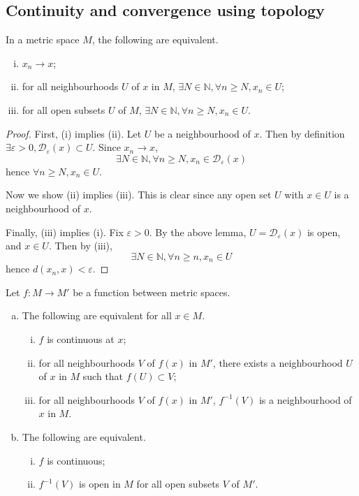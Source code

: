 \subsection{Continuity and convergence using topology}
\begin{proposition}
	In a metric space \( M \), the following are equivalent.
	\begin{enumerate}[(i)]
		\item \( x_n \to x \);
		\item for all neighbourhoods \( U \) of \( x \) in \( M \), \( \exists N \in \mathbb N, \forall n \geq N, x_n \in U \);
		\item for all open subsets \( U \) of \( M \), \( \exists N \in \mathbb N, \forall n \geq N, x_n \in U \).
	\end{enumerate}
\end{proposition}
\begin{proof}
	First, (i) implies (ii).
	Let \( U \) be a neighbourhood of \( x \).
	Then by definition \( \exists \varepsilon > 0, \mathcal D_\varepsilon(x) \subset U \).
	Since \( x_n \to x \),
	\[
		\exists N \in \mathbb N, \forall n \geq N, x_n \in \mathcal D_\varepsilon(x)
	\]
	hence \( \forall n \geq N, x_n \in U \).

	Now we show (ii) implies (iii).
	This is clear since any open set \( U \) with \( x \in U \) is a neighbourhood of \( x \).

	Finally, (iii) implies (i).
	Fix \( \varepsilon > 0 \).
	By the above lemma, \( U = \mathcal D_\varepsilon(x) \) is open, and \( x \in U \).
	Then by (iii),
	\[
		\exists N \in \mathbb N, \forall n \geq n, x_n \in U
	\]
	hence \( d(x_n, x) < \varepsilon \).
\end{proof}
\begin{proposition}
	Let \( f \colon M \to M' \) be a function between metric spaces.
	\begin{enumerate}[(a)]
		\item The following are equivalent for all \( x \in M \).
		      \begin{enumerate}[(i)]
			      \item \( f \) is continuous at \( x \);
			      \item for all neighbourhoods \( V \) of \( f(x) \) in \( M' \), there exists a neighbourhood \( U \) of \( x \) in \( M \) such that \( f(U) \subset V \);
			      \item for all neighbourhoods \( V \) of \( f(x) \) in \( M' \), \( f^{-1}(V) \) is a neighbourhood of \( x \) in \( M \).
		      \end{enumerate}
		\item The following are equivalent.
		      \begin{enumerate}[(i)]
			      \item \( f \) is continuous;
			      \item \( f^{-1}(V) \) is open in \( M \) for all open subsets \( V \) of \( M' \).
		      \end{enumerate}
	\end{enumerate}
\end{proposition}
